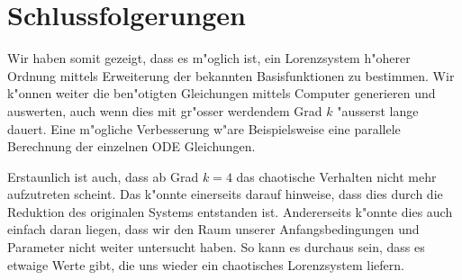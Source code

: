 \section{Schlussfolgerungen}
Wir haben somit gezeigt, dass es m"oglich ist, ein Lorenzsystem h"oherer 
Ordnung 
mittels Erweiterung der bekannten Basisfunktionen zu bestimmen. Wir k"onnen 
weiter die ben"otigten Gleichungen mittels Computer generieren und auswerten, 
auch wenn dies mit gr"osser werdendem Grad $k$ "ausserst lange dauert. Eine 
m"ogliche Verbesserung w"are Beispielsweise eine parallele Berechnung der 
einzelnen ODE Gleichungen.

Erstaunlich ist auch, dass ab Grad $k = 4$ das chaotische Verhalten nicht mehr 
aufzutreten scheint. Das k"onnte einerseits darauf hinweise, dass dies durch 
die Reduktion des originalen Systems entstanden ist. Andererseits k"onnte dies 
auch einfach daran liegen, dass wir den Raum unserer Anfangsbedingungen und 
Parameter nicht weiter untersucht haben. So kann es durchaus sein, dass es 
etwaige Werte gibt, die uns wieder ein chaotisches Lorenzsystem liefern.

